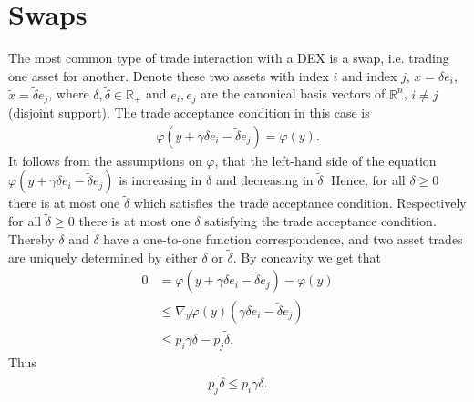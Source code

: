 \section{Swaps}
The most common type of trade interaction with a DEX is a swap, i.e. trading
one asset for another. Denote these two assets with index $i$ and index $j$,
$x=\delta e_i$, $\tilde{x}=\tilde{\delta} e_j$, where $\delta, \tilde{\delta}
\in \mathbb{R}_+$ and $e_i,e_j$ are the canonical basis vectors of
$\mathbb{R}^{n}$, $i \neq j$ (disjoint support). The trade acceptance
condition in this case is
\begin{align}
    \varphi(y + \gamma\delta e_i - \tilde{\delta}e_j) = \varphi(y).
    \label{eq: trade_acceptance_condition}
\end{align}
It follows from the assumptions on $\varphi$, that the left-hand side of the
equation $\varphi(y + \gamma\delta e_i - \tilde{\delta}e_j)$ is increasing
in $\delta$ and decreasing in $\tilde{\delta}$. Hence, for all $\delta \ge 0$
there is at most one $\tilde{\delta}$ which satisfies the trade acceptance
condition. Respectively for all $\tilde{\delta} \ge 0$ there is at most one
$\delta$ satisfying the trade acceptance condition. Thereby $\delta$ and
$\tilde{\delta}$ have a one-to-one function correspondence, and two asset
trades are uniquely determined by either $\delta$ or $\tilde{\delta}$. By
concavity we get that
\begin{align}
    0 &= \varphi(y+\gamma\delta e_i - \tilde{\delta}e_j) - \varphi(y)\\
      &\le \nabla_y \varphi(y) (\gamma\delta e_i - \tilde{\delta}e_j) \\
      &\le p_i \gamma \delta - p_j \tilde{\delta}.
\end{align}
Thus
\begin{align}
    p_j \tilde{\delta} \le p_i \gamma \delta.
\end{align}

